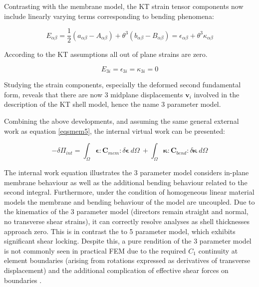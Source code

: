 Contrasting with the membrane model, the KT strain tensor components now include linearly varying terms corresponding to bending phenomena:

\begin{equation} 
E_{\alpha \beta}
= \frac{1}{2}
(a_{\alpha\beta} - A_{\alpha\beta})
+
\theta^3 (b_{\alpha\beta} - B_{\alpha\beta})
=
\epsilon_{\alpha \beta} + \theta^3 \kappa_{\alpha \beta}
\label{eqskt8}
\end{equation}

According to the KT assumptions all out of plane strains are zero.

\begin{equation} 
E_{3i} = \epsilon_{3i} = \kappa_{3i} = 0
\label{eqskt81}
\end{equation}

Studying the strain components, especially the deformed second fundamental form, reveals that there are now 3 midplane displacements $\mathbf{v}_i$ involved in the description of the KT shell model, hence the name 3 parameter model. 

Combining the above developments, and assuming the same general external work as equation \eqref{eqsmem5}, the internal virtual work can be presented:

\begin{equation} 
-\delta\Pi_{int} = 
\int_\Omega
\boldsymbol{\epsilon}
:
\mathbf{C}_{mem}
:
\delta \boldsymbol{\epsilon}\ d \Omega\ 
+
\int_\Omega
\boldsymbol{\kappa}
:
\mathbf{C}_{bend}
:
\delta \boldsymbol{\kappa}\ 
d \Omega
\label{eqskt9}
\end{equation}

The internal work equation illustrates the 3 parameter model considers in-plane membrane behaviour as well as the additional bending behaviour related to the second integral. Furthermore, under the condition of homogeneous linear material models the membrane and bending behaviour of the model are uncoupled. Due to the kinematics of the 3 parameter model (directors remain straight and normal, no transverse shear strains), it can correctly resolve analyses as shell thicknesses approach zero. This is in contrast the to 5 parameter model, which exhibits significant shear locking. Despite this, a pure rendition of the 3 parameter model is not commonly seen in practical FEM due to the required $C_1$ continuity at element boundaries (arising from rotations expressed as derivatives of transverse displacement) and the additional complication of effective shear forces on boundaries \cite{BischLitBook04}.


